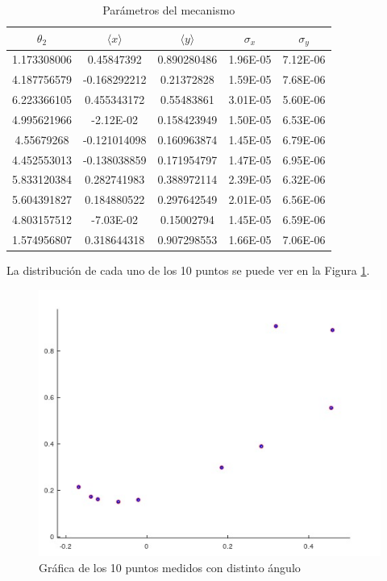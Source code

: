 \documentclass[a4paper, 12pt]{article}
\begin{document}
    \begin{table}[h!]
        \centering
        \begin{tabular}{|c|c|c|c|c|}
            \hline
            $\theta_2$ & $\langle x \rangle$ & $\langle y \rangle$ & $\sigma_x$ & $\sigma_y$ \\
            \hline
            1.173308006 & 0.45847392 & 0.890280486 & 1.96E-05 & 7.12E-06 \\
            4.187756579 & -0.168292212 & 0.21372828 & 1.59E-05 & 7.68E-06 \\
            6.223366105 & 0.455343172 & 0.55483861 & 3.01E-05 & 5.60E-06 \\
            4.995621966 & -2.12E-02 & 0.158423949 & 1.50E-05 & 6.53E-06 \\
            4.55679268 & -0.121014098 & 0.160963874 & 1.45E-05 & 6.79E-06 \\
            4.452553013 & -0.138038859 & 0.171954797 & 1.47E-05 & 6.95E-06 \\
            5.833120384 & 0.282741983 & 0.388972114 & 2.39E-05 & 6.32E-06 \\
            5.604391827 & 0.184880522 & 0.297642549 & 2.01E-05 & 6.56E-06 \\
            4.803157512 & -7.03E-02 & 0.15002794 & 1.45E-05 & 6.59E-06 \\
            1.574956807 & 0.318644318 & 0.907298553 & 1.66E-05 & 7.06E-06 \\
            \hline
        \end{tabular}
        \caption{Parámetros del mecanismo}
        \label{Tabla:2}
    \end{table}

    La distribución de cada uno de los 10 puntos se puede ver en la Figura \ref{GraficaGeneral}.

    \begin{figure}[h!]
        \centering
        \includegraphics[width=12cm]{img/graficaPuntos.jpeg}
        \caption{Gráfica de los 10 puntos medidos con distinto ángulo}
        \label{GraficaGeneral}
    \end{figure}
\end{document}
